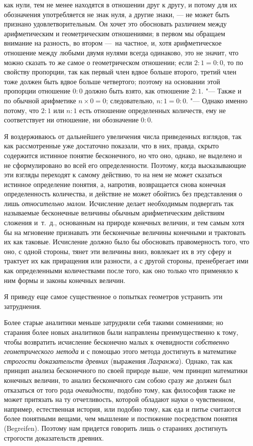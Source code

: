 как нули, тем не менее находятся в отношении друг к другу, и потому для их
обозначения употребляется не знак нуля, а другие знаки, — не может быть
признано удовлетворительным. Он хочет это обосновать различием между
арифметическим и геометрическим отношениями; в первом мы обращаем внимание
на разность, во втором —~на частное, и, хотя арифметическое отношение между
любыми двумя нулями всегда одинаково, это не значит, что можно сказать то
же самое о геометрическом отношении; если $2 : 1 = 0 : 0$,
то по свойству пропорции, так как первый член вдвое больше второго, третий
член тоже должен быть вдвое больше четвертого; поэтому на основании этой
пропорции отношение $0 : 0$ должно быть взято, как отношение
$2 : 1$. "--- Также и по обычной арифметике $n \times 0 = 0$; следовательно,
$n : 1 = 0 : 0$. "--- Однако именно потому, что $2 : 1$ или $n : 1$
есть отношение определенных количеств, ему не соответствует ни отношение,
ни обозначение $0 : 0$.

Я воздерживаюсь от дальнейшего увеличения числа приведенных взглядов, так
как рассмотренные уже достаточно показали, что в них, правда, скрыто
содержится истинное понятие бесконечного, но что оно, однако, не выделено и
не сформулировано во всей его определенности. Поэтому, когда высказывающие
эти взгляды переходят к самому действию, то на нем не может сказаться
истинное определение понятия, а, напротив, возвращается снова конечная
определенность количества, и действие не может обойтись без представления о
лишь {\em относительно малом}. Исчисление делает
необходимым подвергать так называемые бесконечные величины обычным
арифметическим действиям сложения и~т.~д., основанным на природе конечных
величин, и тем самым хотя бы на мгновение признавать эти бесконечные
величины конечными и трактовать их как таковые. Исчисление должно было бы
обосновать правомерность того, что оно, с одной стороны, тянет эти величины
вниз, вовлекает их в эту сферу и трактует их как приращения или разности, а
с другой стороны, пренебрегает ими как определенными количествами после
того, как оно только что применяло к ним формы и законы конечных величин.

Я приведу еще самое существенное о попытках геометров устранить эти
затруднения.

Более старые аналитики меньше затрудняли себя такими сомнениями; но старания
более новых аналитиков были направлены преимущественно к тому, чтобы
возвратить исчисление бесконечно малых к очевидности
{\em собственно геометрического метода} и с помощью
этого метода достигнуть в математике {\em строгости
доказательств древних} (выражения {\em Лагранжа}).
Однако, так как принцип анализа бесконечного по своей природе выше, чем
принцип математики конечных величин, то анализ бесконечного сам собою сразу
же должен был отказаться от того рода
{\em очевидности}, подобно тому, как философия также не
может притязать на ту отчетливость, которой обладают науки о чувственном,
например, естественная история, или подобно тому, как еда и питье считаются
более понятными вещами, чем мышление и постижение посредством понятия
(Begreifen). Поэтому нам придется говорить лишь о стараниях достигнуть
строгости доказательств древних.

